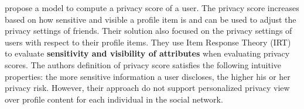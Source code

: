 \cite{alemany_estimation_2018}

\cite{zhang_privacypreserving_2017}


\cite{liu_framework_2010} propose a model to compute a privacy score of a user.
The privacy score increases based on how sensitive and visible a profile item is and can be used to adjust the privacy settings of friends.
Their solution also focused on the privacy settings of users with respect to their profile items.
They use Item Response Theory (IRT) to evaluate \textbf{sensitivity and visibility of attributes} when evaluating privacy scores.
The authors definition of privacy score satisfies the following intuitive properties: the more sensitive information a user discloses,
	the higher his or her privacy risk.
However,
	their approach do not support personalized privacy view over profile content for each individual in the social network.



